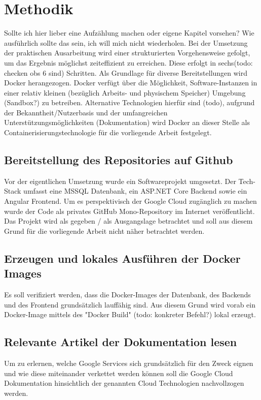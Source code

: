 \documentclass[pdftex,a4paper,abstracton,11pt,parskip=half,bibtotocnumbered]{scrartcl}
\begin{document}
\section{Methodik}
	Sollte ich hier lieber eine Aufzählung machen oder eigene Kapitel vorsehen? Wie ausführlich sollte das sein, ich will mich nicht wiederholen. 
	Bei der Umsetzung der praktischen Ausarbeitung wird einer strukturierten Vorgehensweise gefolgt, um das Ergebnis möglichst zeiteffizient zu 
	erreichen. Diese erfolgt in sechs(todo: checken obs 6 sind) Schritten.
	Als Grundlage für diverse Bereitstellungen wird Docker herangezogen. Docker verfügt über die Möglichkeit, Software-Instanzen in einer relativ kleinen 
	(bezüglich Arbeits- und physischem Speicher) Umgebung (Sandbox?) zu betreiben. Alternative Technologien hierfür sind (todo), aufgrund der 
	Bekanntheit/Nutzerbasis und der	umfangreichen Unterstützungsmöglichkeiten (Dokumentation) wird Docker an dieser Stelle als Containerisierungstechnologie
	für die vorliegende Arbeit festgelegt.  

	\subsection{Bereitstellung des Repositories auf Github}
	Vor der eigentlichen Umsetzung wurde ein Softwareprojekt umgesetzt. Der Tech-Stack umfasst eine MSSQL Datenbank, ein ASP.NET Core Backend sowie	ein
	Angular Frontend. Um es perspektivisch der Google Cloud zugänglich zu machen wurde der Code als privates GitHub Mono-Repository im Internet veröffentlicht.
	Das Projekt wird als gegeben / als Ausgangslage betrachtet und soll aus diesem Grund für die vorliegende Arbeit nicht näher betrachtet werden.  

	\subsection{Erzeugen und lokales Ausführen der Docker Images}
	Es soll verifiziert werden, dass die Docker-Images der Datenbank, des Backends und des Frontend grundsätzlich lauffähig sind. Aus diesem Grund wird 
	vorab ein Docker-Image mittels des "Docker Build" (todo: konkreter Befehl?) lokal erzeugt.

	\subsection{Relevante Artikel der Dokumentation lesen}
	Um zu erlernen, welche Google Services sich grundsätzlich für den Zweck eignen und wie diese miteinander verkettet werden können soll die Google
	Cloud Dokumentation hinsichtlich der genannten Cloud Technologien nachvollzogen werden.
\end{document}
